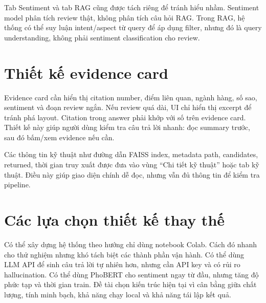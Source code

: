 Tab Sentiment và tab RAG cũng được tách riêng để tránh hiểu nhầm. Sentiment model phân tích review thật, không phân tích câu hỏi RAG. Trong RAG, hệ thống có thể suy luận intent/aspect từ query để áp dụng filter, nhưng đó là query understanding, không phải sentiment classification cho review.

\section{Thiết kế evidence card}
Evidence card cần hiển thị citation number, điểm liên quan, ngành hàng, số sao, sentiment và đoạn review ngắn. Nếu review quá dài, UI chỉ hiển thị excerpt để tránh phá layout. Citation trong answer phải khớp với số trên evidence card. Thiết kế này giúp người dùng kiểm tra câu trả lời nhanh: đọc summary trước, sau đó bấm/xem evidence nếu cần.

Các thông tin kỹ thuật như đường dẫn FAISS index, metadata path, candidates, returned, thời gian truy xuất được đưa vào vùng “Chi tiết kỹ thuật” hoặc tab kỹ thuật. Điều này giúp giao diện chính dễ đọc, nhưng vẫn đủ thông tin để kiểm tra pipeline.

\section{Các lựa chọn thiết kế thay thế}
Có thể xây dựng hệ thống theo hướng chỉ dùng notebook Colab. Cách đó nhanh cho thử nghiệm nhưng khó tách biệt các thành phần vận hành. Có thể dùng LLM API để sinh câu trả lời tự nhiên hơn, nhưng cần API key và có rủi ro hallucination. Có thể dùng PhoBERT cho sentiment ngay từ đầu, nhưng tăng độ phức tạp và thời gian train. Đề tài chọn kiến trúc hiện tại vì cân bằng giữa chất lượng, tính minh bạch, khả năng chạy local và khả năng tái lập kết quả.

